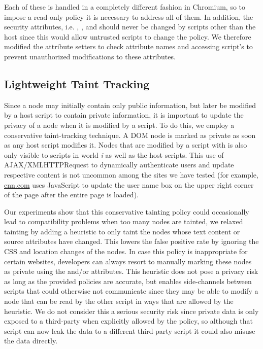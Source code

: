 Each of these is handled in a completely different fashion in Chromium, so to impose a read-only policy it is necessary to address all of them.  In addition, the security attributes, i.e. , , and  should never be changed by scripts other than the host since this would allow untrusted scripts to change the policy.  We therefore modified the attribute setters to check attribute names and accessing script's  to prevent unauthorized modifications to these attributes. 

\subsection{Lightweight Taint Tracking}
\label{sec:esorics_impl_taint}

Since a node may initially contain only public information, but later be modified by a host script to contain private information, it is important to update the privacy of a node when it is modified by a script.  To do this, we employ a conservative taint-tracking technique.  A DOM node is marked as private as soon as any host script modifies it.  Nodes that are modified by a script with  is also only visible to scripts in world \emph{i} as well as the host scripts.  This use of AJAX/XMLHTTPRequest to dynamically authenticate users and update respective content is not uncommon among the sites we have tested (for example, \url{cnn.com} uses JavaScript to update the user name box on the upper right corner of the page after the entire page is loaded).

Our experiments show that this conservative tainting policy could occasionally lead to compatibility problems when too many nodes are tainted, we relaxed tainting by adding a heuristic to only taint the nodes whose text content or source attributes have changed.  This lowers the false positive rate by ignoring the CSS and location changes of the nodes.  In case this policy is inappropriate for certain websites, developers can always resort to manually marking these nodes as private using the  and/or  attributes.  This heuristic does not pose a privacy risk as long as the provided policies are accurate, but enables side-channels between scripts that could otherwise not communicate since they may be able to modify a node that can be read by the other script in ways that are allowed by the heuristic.  We do not consider this a serious security risk since private data is only exposed to a third-party when explicitly allowed by the policy, so although that script can now leak the data to a different third-party script it could also misuse the data directly.  

